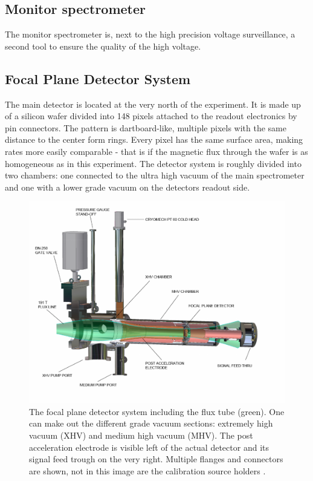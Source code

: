       \subsection{Monitor spectrometer}
      \label{ch:theKATRINexperiment:sec:experimentalSetup:subsec:monSpec}
      
      The monitor spectrometer is, next to the high precision voltage surveillance, a second tool to ensure the quality of the high voltage.

     
      \subsection{Focal Plane Detector System}
      \label{ch:The KATRIN experiment:sec:Experimental setup:subsec:FPD system}
      The main detector is located at the very north of the experiment. It is made up of a silicon wafer divided into 148 pixels attached to the readout electronics by pin connectors. The pattern is dartboard-like, multiple pixels with the same distance to the center form rings. Every pixel has the same surface area, making rates more easily comparable - that is if the magnetic flux through the wafer is as homogeneous as in this experiment.
      The detector system is roughly divided into two chambers: one connected to the ultra high vacuum of the main spectrometer and one with a lower grade vacuum on the detectors readout side.
      
      
      \begin{figure}
      \centering
	\includegraphics[width = 0.8 \textwidth]{graphics/katrinExperiment/detectorHousing.pdf}
	\caption[Focal plane detector system]{The focal plane detector system including the flux tube (green). One can make out the different grade vacuum sections: extremely high vacuum (XHV) and medium high vacuum (MHV). The post acceleration electrode is visible left of the actual detector and its signal feed trough on the very right. Multiple flanges and connectors are shown, not in this image are the calibration source holders \cite{FPD}.}
	\label{fig:katrinExperiment:detectorHousing}
      \end{figure}
      
